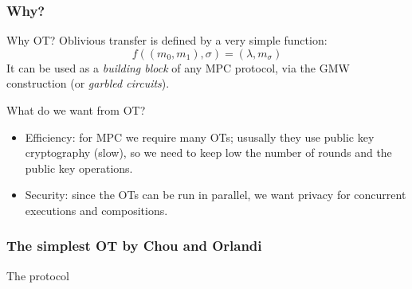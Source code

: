 \documentclass{beamer}
\begin{document}
    \begin{frame}
        \frametitle{Why?}
        \begin{block}{Why OT?}
            Oblivious transfer is defined by a very simple function: $$f((m_0,m_1),\sigma)=(\lambda,m_\sigma)$$
            It can be used as a \emph{building block} of any MPC protocol, via the GMW construction (or \emph{garbled circuits}).
        \end{block}
    
        \pause
        \begin{block}{What do we want from OT?}
            \begin{itemize}
                \item Efficiency: for MPC we require many OTs; ususally they use public key cryptography (slow), so we need to keep low the number of rounds and the public key operations.
                \item Security: since the OTs can be run in parallel, we want privacy for concurrent executions and compositions.
            \end{itemize}
        \end{block}
    
    \end{frame}

    \begin{frame}
        \frametitle{The simplest OT by Chou and Orlandi}
        
        \begin{block}{The protocol}
                    \begin{center}
            \end{center}
        \end{block}
        

    \end{frame}
\end{document}
